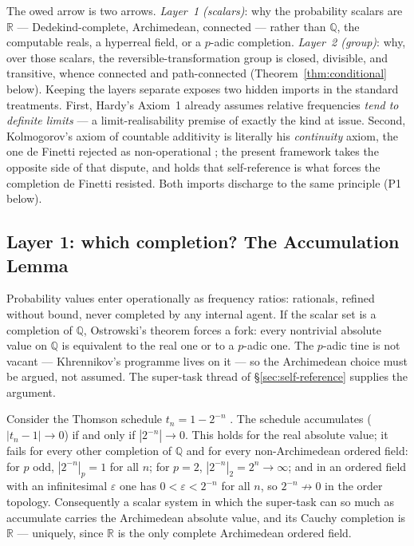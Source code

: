 The owed arrow is two arrows. \emph{Layer~1 (scalars)}: why the probability scalars are
$\mathbb{R}$ --- Dedekind-complete, Archimedean, connected --- rather than $\mathbb{Q}$,
the computable reals, a hyperreal field, or a $p$-adic completion. \emph{Layer~2 (group)}:
why, over those scalars, the reversible-transformation group is closed, divisible, and
transitive, whence connected and path-connected (Theorem~\ref{thm:conditional} below).
Keeping the layers separate exposes two hidden imports in the standard treatments. First,
Hardy's Axiom~1 already assumes relative frequencies \emph{tend to definite limits} --- a
limit-realisability premise of exactly the kind at issue. Second, Kolmogorov's axiom of
countable additivity is literally his \emph{continuity} axiom, the one de Finetti rejected
as non-operational \cite{kolmogorov1933, definetti}; the present framework takes the
opposite side of that dispute, and holds that self-reference is what forces the
completion de Finetti resisted. Both imports discharge to the same principle (P1 below).

\subsection{Layer 1: which completion? The Accumulation Lemma}
\label{app:cont-scalar}

Probability values enter operationally as frequency ratios: rationals, refined without
bound, never completed by any internal agent. If the scalar set is a completion of
$\mathbb{Q}$, Ostrowski's theorem \cite{ostrowski1916} forces a fork: every nontrivial
absolute value on $\mathbb{Q}$ is equivalent to the real one or to a $p$-adic one. The
$p$-adic tine is not vacant --- Khrennikov's programme lives on it
\cite{khrennikov-padic} --- so the Archimedean choice must be argued, not assumed. The
super-task thread of \S\ref{sec:self-reference} supplies the argument.

\begin{lemma}\label{lem:accumulation}
Consider the Thomson schedule $t_n = 1 - 2^{-n}$ \cite{thomson1954}. The schedule
accumulates ($|t_n - 1| \to 0$) if and only if $|2^{-n}| \to 0$. This holds for the real
absolute value; it fails for every other completion of $\mathbb{Q}$ and for every
non-Archimedean ordered field: for $p$ odd, $|2^{-n}|_p = 1$ for all $n$; for $p = 2$,
$|2^{-n}|_2 = 2^{n} \to \infty$; and in an ordered field with an infinitesimal
$\varepsilon$ one has $0 < \varepsilon < 2^{-n}$ for all $n$, so $2^{-n} \not\to 0$ in the
order topology. Consequently a scalar system in which the super-task can so much as
accumulate carries the Archimedean absolute value, and its Cauchy completion is
$\mathbb{R}$ --- uniquely, since $\mathbb{R}$ is the only complete Archimedean ordered
field.
\end{lemma}

